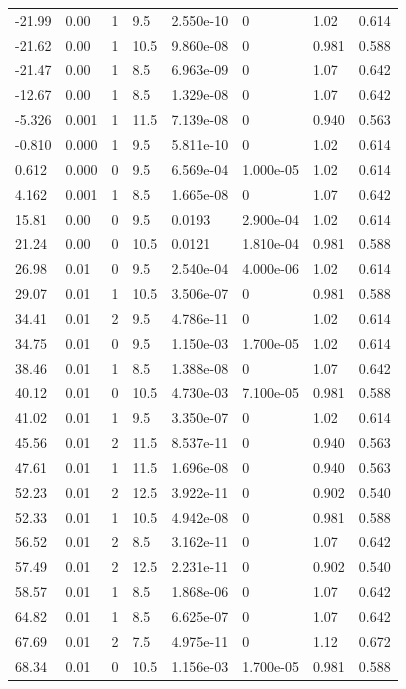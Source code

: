 \documentclass[preview]{standalone}
\begin{document}
{{\begin{tabular}{L{1.2cm}C{1.2cm} C{0.3cm}C{0.5cm} C{1.4cm}C{1.4cm} C{1.4cm}C{1.4cm}}
  -21.99  &  0.00  & 1     & 9.5 &  2.550e-10  & 0  & 1.02 &  0.614   \\ 
  -21.62  &  0.00  & 1     & 10.5 &  9.860e-08  & 0  & 0.981 &  0.588   \\ 
  -21.47  &  0.00  & 1     & 8.5 &  6.963e-09  & 0  & 1.07 &  0.642   \\ 
  -12.67  &  0.00  & 1     & 8.5 &  1.329e-08  & 0  & 1.07 &  0.642   \\ 
  -5.326  &  0.001  & 1     & 11.5 &  7.139e-08  & 0  & 0.940 &  0.563   \\ 
  -0.810  &  0.000  & 1     & 9.5 &  5.811e-10  & 0  & 1.02 &  0.614   \\ 
  0.612  &  0.000  & 0     & 9.5 &  6.569e-04  & 1.000e-05  & 1.02 &  0.614   \\ 
  4.162  &  0.001  & 1     & 8.5 &  1.665e-08  & 0  & 1.07 &  0.642   \\ 
  15.81  &  0.00  & 0     & 9.5 &  0.0193  & 2.900e-04  & 1.02 &  0.614   \\ 
  21.24  &  0.00  & 0     & 10.5 &  0.0121  & 1.810e-04  & 0.981 &  0.588   \\ 
  26.98  &  0.01  & 0     & 9.5 &  2.540e-04  & 4.000e-06  & 1.02 &  0.614   \\ 
  29.07  &  0.01  & 1     & 10.5 &  3.506e-07  & 0  & 0.981 &  0.588   \\ 
  34.41  &  0.01  & 2     & 9.5 &  4.786e-11  & 0  & 1.02 &  0.614   \\ 
  34.75  &  0.01  & 0     & 9.5 &  1.150e-03  & 1.700e-05  & 1.02 &  0.614   \\ 
  38.46  &  0.01  & 1     & 8.5 &  1.388e-08  & 0  & 1.07 &  0.642   \\ 
  40.12  &  0.01  & 0     & 10.5 &  4.730e-03  & 7.100e-05  & 0.981 &  0.588   \\ 
  41.02  &  0.01  & 1     & 9.5 &  3.350e-07  & 0  & 1.02 &  0.614   \\ 
  45.56  &  0.01  & 2     & 11.5 &  8.537e-11  & 0  & 0.940 &  0.563   \\ 
  47.61  &  0.01  & 1     & 11.5 &  1.696e-08  & 0  & 0.940 &  0.563   \\ 
  52.23  &  0.01  & 2     & 12.5 &  3.922e-11  & 0  & 0.902 &  0.540   \\ 
  52.33  &  0.01  & 1     & 10.5 &  4.942e-08  & 0  & 0.981 &  0.588   \\ 
  56.52  &  0.01  & 2     & 8.5 &  3.162e-11  & 0  & 1.07 &  0.642   \\ 
  57.49  &  0.01  & 2     & 12.5 &  2.231e-11  & 0  & 0.902 &  0.540   \\ 
  58.57  &  0.01  & 1     & 8.5 &  1.868e-06  & 0  & 1.07 &  0.642   \\ 
  64.82  &  0.01  & 1     & 8.5 &  6.625e-07  & 0  & 1.07 &  0.642   \\ 
  67.69  &  0.01  & 2     & 7.5 &  4.975e-11  & 0  & 1.12 &  0.672   \\ 
  68.34  &  0.01  & 0     & 10.5 &  1.156e-03  & 1.700e-05  & 0.981 &  0.588   \\ 
\hline 
\end{tabular} 

}}
\end{document}
